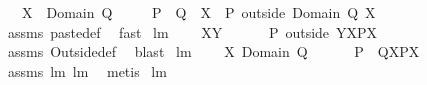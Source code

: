 \begin{isabellebody}
\ \ \ {\isachardoublequoteopen}X\ {\isasyminter}\ {\isacharparenleft}Domain\ Q{\isacharparenright}\ {\isacharequal}\ {\isacharbraceleft}{\isacharbraceright}{\isachardoublequoteclose}\isanewline
\ \ \ {\isachardoublequoteopen}{\isacharparenleft}P\ {\isacharplus}{\isacharasterisk}\ Q{\isacharparenright}\ {\isacharbackquote}{\isacharbackquote}\ X\ {\isacharequal}\ {\isacharparenleft}P\ outside\ {\isacharparenleft}Domain\ Q{\isacharparenright}{\isacharparenright}{\isacharbackquote}{\isacharbackquote}\ X{\isachardoublequoteclose}\ \isanewline
%
\isadelimproof
\ \ %
\endisadelimproof
%
\isatagproof
{}\isamarkupfalse%
\ assms\ paste{\isacharunderscore}def\ \isamarkupfalse%
\ fast%
\endisatagproof
{\isafoldproof}%
%
\isadelimproof
\isanewline
%
\endisadelimproof
\isanewline
{}\isamarkupfalse%
\ lm{}{}{}{\isacharcolon}\ \isanewline
\ \ \ {\isachardoublequoteopen}X{\isasyminter}Y\ {\isacharequal}\ {\isacharbraceleft}{\isacharbraceright}{\isachardoublequoteclose}\ \isanewline
\ \ \ {\isachardoublequoteopen}{\isacharparenleft}P\ outside\ Y{\isacharparenright}{\isacharbackquote}{\isacharbackquote}X{\isacharequal}P{\isacharbackquote}{\isacharbackquote}X{\isachardoublequoteclose}\ \isanewline
%
\isadelimproof
\ \ %
\endisadelimproof
%
\isatagproof
{}\isamarkupfalse%
\ assms\ Outside{\isacharunderscore}def\ \isamarkupfalse%
\ blast%
\endisatagproof
{\isafoldproof}%
%
\isadelimproof
\isanewline
%
\endisadelimproof
\isanewline
{}\isamarkupfalse%
\ lm{}{}{}{\isacharcolon}\ \isanewline
\ \ \ {\isachardoublequoteopen}X{\isasyminter}\ {\isacharparenleft}Domain\ Q{\isacharparenright}\ {\isacharequal}\ {\isacharbraceleft}{\isacharbraceright}{\isachardoublequoteclose}\ \isanewline
\ \ \ {\isachardoublequoteopen}{\isacharparenleft}P\ {\isacharplus}{\isacharasterisk}\ Q{\isacharparenright}{\isacharbackquote}{\isacharbackquote}X{\isacharequal}P{\isacharbackquote}{\isacharbackquote}X{\isachardoublequoteclose}\ \isanewline
%
\isadelimproof
\ \ %
\endisadelimproof
%
\isatagproof
{}\isamarkupfalse%
\ assms\ lm{}{}{}\ lm{}{}{}\ \isamarkupfalse%
\ metis%
\endisatagproof
{\isafoldproof}%
%
\isadelimproof
\isanewline
%
\endisadelimproof
\isanewline
{}\isamarkupfalse%
\ lm{}{}{}{\isacharcolon}\ \isanewline

\end{isabellebody}
